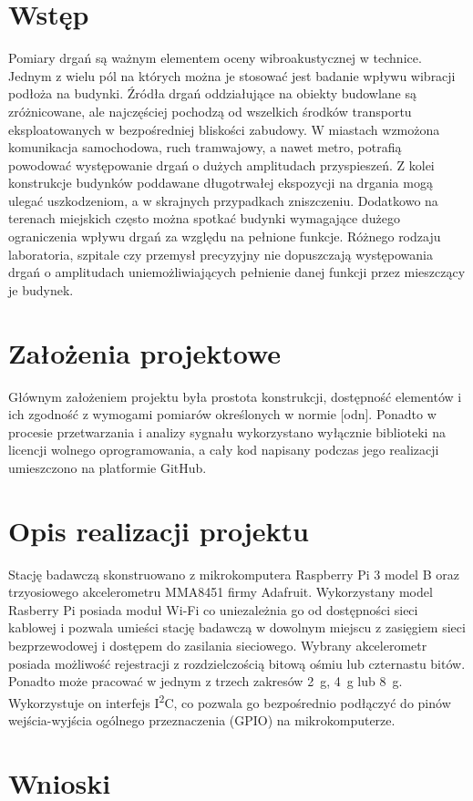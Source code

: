\documentclass[a4paper,12pt]{mwart}
\begin{document}
\section{Wstęp}
Pomiary drgań są ważnym elementem oceny wibroakustycznej w technice. Jednym z
wielu pól na których można je stosować jest badanie wpływu wibracji podłoża na
budynki. Źródła drgań oddziałujące na obiekty budowlane są zróżnicowane, ale
najczęściej pochodzą od wszelkich środków transportu eksploatowanych w
bezpośredniej bliskości zabudowy. W miastach wzmożona komunikacja samochodowa,
ruch tramwajowy, a nawet metro, potrafią powodować występowanie drgań o dużych
amplitudach przyspieszeń. Z kolei konstrukcje budynków poddawane długotrwałej
ekspozycji na drgania mogą ulegać uszkodzeniom, a w skrajnych przypadkach
zniszczeniu. Dodatkowo na terenach miejskich często można spotkać budynki
wymagające dużego ograniczenia wpływu drgań za względu na pełnione funkcje.
Różnego rodzaju laboratoria, szpitale czy przemysł precyzyjny nie dopuszczają
występowania drgań o amplitudach uniemożliwiających pełnienie danej funkcji
przez mieszczący je budynek.

\section{Założenia projektowe}
Głównym założeniem projektu była prostota konstrukcji, dostępność elementów i
ich zgodność z wymogami pomiarów określonych w normie [odn]. Ponadto w procesie
przetwarzania i analizy sygnału wykorzystano wyłącznie biblioteki na licencji
wolnego oprogramowania, a cały kod napisany podczas jego realizacji umieszczono
na platformie GitHub.

\section{Opis realizacji projektu}
Stację badawczą skonstruowano z mikrokomputera Raspberry Pi 3 model B oraz
trzyosiowego akcelerometru MMA8451 firmy Adafruit. Wykorzystany model Rasberry
Pi posiada moduł Wi-Fi co uniezależnia go od dostępności sieci kablowej i
pozwala umieści stację badawczą w dowolnym miejscu z zasięgiem sieci
bezprzewodowej i dostępem do zasilania sieciowego. Wybrany akcelerometr posiada
możliwość rejestracji z rozdzielczością bitową ośmiu lub czternastu bitów.
Ponadto może pracować w jednym z trzech zakresów \SI{2}{\g}, \SI{4}{\g} lub
\SI{8}{\g}. Wykorzystuje on interfejs I\textsuperscript{2}C, co pozwala go
bezpośrednio podłączyć do pinów wejścia-wyjścia ogólnego przeznaczenia (GPIO)
na mikrokomputerze.

\section{Wnioski}
\end{document}
